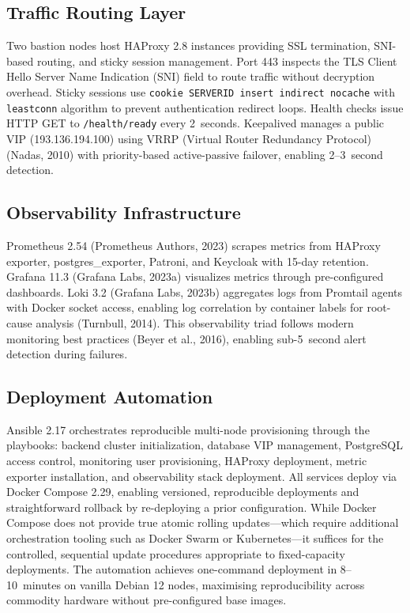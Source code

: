 \documentclass[a4paper,twoside]{article}
\begin{document}
\subsection{Traffic Routing Layer}

Two bastion nodes host HAProxy 2.8 instances providing SSL termination, SNI-based routing, and sticky session management. Port 443 inspects the TLS Client Hello Server Name Indication (SNI) field to route traffic without decryption overhead. Sticky sessions use \texttt{cookie SERVERID insert indirect nocache} with \texttt{leastconn} algorithm to prevent authentication redirect loops. Health checks issue HTTP GET to \texttt{/health/ready} every 2~seconds. Keepalived manages a public VIP (193.136.194.100) using VRRP (Virtual Router Redundancy Protocol) (Nadas, 2010) with priority-based active-passive failover, enabling 2--3~second detection.

\subsection{Observability Infrastructure}

Prometheus 2.54 (Prometheus Authors, 2023) scrapes metrics from HAProxy exporter, postgres\_exporter, Patroni, and Keycloak with 15-day retention. Grafana 11.3 (Grafana Labs, 2023a) visualizes metrics through pre-configured dashboards. Loki 3.2 (Grafana Labs, 2023b) aggregates logs from Promtail agents with Docker socket access, enabling log correlation by container labels for root-cause analysis (Turnbull, 2014). This observability triad follows modern monitoring best practices (Beyer et al., 2016), enabling sub-5~second alert detection during failures.

\subsection{Deployment Automation}

Ansible 2.17 orchestrates reproducible multi-node provisioning through the playbooks: backend cluster initialization, database VIP management, PostgreSQL access control, monitoring user provisioning, HAProxy deployment, metric exporter installation, and observability stack deployment. All services deploy via Docker Compose 2.29, enabling versioned, reproducible deployments and straightforward rollback by re-deploying a prior configuration. While Docker Compose does not provide true atomic rolling updates---which require additional orchestration tooling such as Docker Swarm or Kubernetes---it suffices for the controlled, sequential update procedures appropriate to fixed-capacity deployments. The automation achieves one-command deployment in 8--10~minutes on vanilla Debian 12 nodes, maximising reproducibility across commodity hardware without pre-configured base images.
\end{document}
